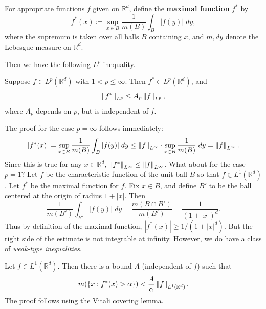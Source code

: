 \documentclass{article}
\begin{document}
\begin{definition}
	For appropriate functions $f$ given on $\mathbb{R}^{d}$, define the \textbf{maximal function} $f^{\ast}$ by 
	\begin{equation}
		f^{\ast}(x) \coloneqq \sup_{x \in B}\frac{1}{m(B)}\int_{B}|f(y)|\;dy, 
	\end{equation}
	where the supremum is taken over all balls $B$ containing $x$, and $m, dy$ denote the Lebesgue measure on $\mathbb{R}^{d}$. 
\end{definition} 

Then we have the following $L^{p}$ inequality. 
\begin{theorem}
	Suppose $f \in L^{p}(\mathbb{R}^{d})$ with $1 < p \leq \infty$. Then $f^{\ast} \in L^{p}(\mathbb{R}^{d})$, and 
	\begin{equation*}
		\left\Vert f^{\ast} \right\Vert_{L^{p}} \leq A_{p}\left\Vert f \right\Vert_{L^{p}}, 
	\end{equation*} 
	where $A_{p}$ depends on $p$, but is independent of $f$. 	
\end{theorem} 
\begin{remark}
	The proof for the case $p = \infty$ follows immediately: 
	\begin{equation*}
		|f^{\ast}(x)| = \sup_{x \in B}\frac{1}{m(B)}\int_{B}|f(y)|\;dy \leq \left\Vert f \right\Vert_{L^{\infty}}\cdot \sup_{x \in B}\frac{1}{m(B)}\;dy = \left\Vert f \right\Vert_{L^{\infty}}. 
	\end{equation*} 
	Since this is true for any $x \in \mathbb{R}^{d}$, $\left\Vert f^{\ast} \right\Vert_{L^{\infty}} \leq \left\Vert f \right\Vert_{L^{\infty}}$. What about for the case $p = 1$? Let $f$ be the characteristic function of the unit ball $B$ so that $f \in L^{1}(\mathbb{R}^{d})$. Let $f^{\ast}$ be the maximal function for $f$. Fix $x \in B$, and define $B'$ to be the ball centered at the origin of radius $1 + |x|$. Then 
	\begin{equation*}
		\frac{1}{m(B')}\int_{B'}|f(y)|\;dy = \frac{m(B \cap B')}{m(B')} = \frac{1}{(1 + |x|)^{d}}. 
	\end{equation*} 
	Thus by definition of the maximal function, $|f^{\ast}(x)| \geq 1/(1 + |x|^{d})$. But the right side of the estimate is not integrable at infinity. However, we do have a class of \textit{weak-type inequalities}. 
\end{remark} 
\begin{prop}
	Let $f \in L^{1}(\mathbb{R}^{d})$. Then there is a bound $A$ (independent of $f$) such that 
	\begin{equation*}
		m(\{x: f^{\ast}(x) >\alpha\}) < \frac{A}{\alpha}\left\Vert f \right\Vert_{L^{1}(\mathbb{R}^{d})}. 
	\end{equation*}
	The proof follows using the Vitali covering lemma. 
\end{prop} 
\end{document}
